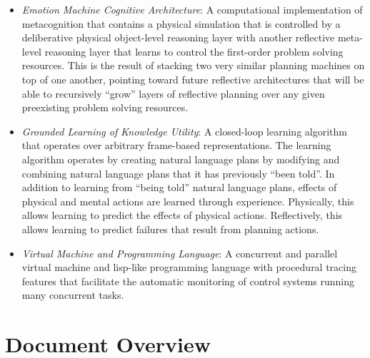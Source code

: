 \begin{itemize}
\item \emph{Emotion Machine Cognitive Architecture}: A computational
  implementation of metacognition that contains a physical simulation
  that is controlled by a deliberative physical object-level reasoning
  layer with another reflective meta-level reasoning layer that learns
  to control the first-order problem solving resources.  This is the
  result of stacking two very similar planning machines on top of one
  another, pointing toward future reflective architectures that will
  be able to recursively ``grow'' layers of reflective planning over
  any given preexisting problem solving resources.
\item \emph{Grounded Learning of Knowledge Utility}: A closed-loop
  learning algorithm that operates over arbitrary frame-based
  representations.  The learning algorithm operates by creating
  natural language plans by modifying and combining natural language
  plans that it has previously ``been told''.  In addition to learning
  from ``being told'' natural language plans, effects of physical and
  mental actions are learned through experience.  Physically, this
  allows learning to predict the effects of physical actions.
  Reflectively, this allows learning to predict failures that result
  from planning actions.
\item \emph{Virtual Machine and Programming Language}: A concurrent
  and parallel virtual machine and lisp-like programming language with
  procedural tracing features that facilitate the automatic monitoring
  of control systems running many concurrent tasks.
\end{itemize}

\section{Document Overview}


